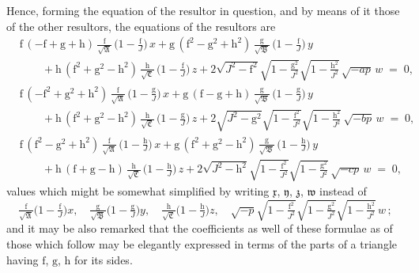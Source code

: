 \documentclass[11pt]{article}
\providecommand{\fA}{\mathfrak{A}}
\providecommand{\fB}{\mathfrak{B}}
\providecommand{\fC}{\mathfrak{C}}
\begin{document}
Hence, forming the equation of the resultor in question, and by means of it those of the other resultors, the equations of the resultors are
\begin{align*}
&\mathrm{f}\,(-\mathrm{f} + \mathrm{g} + \mathrm{h})\,\tfrac{\mathrm{f}}{\sqrt{\fA}}\,\bigl(1 - \tfrac{\mathrm{f}}{J}\bigr)\,x + \mathrm{g}\,(\mathrm{f}^{2} - \mathrm{g}^{2} + \mathrm{h}^{2})\,\tfrac{\mathrm{g}}{\sqrt{\fB}}\,\bigl(1 - \tfrac{\mathrm{f}}{J}\bigr)\,y\\
&\qquad + \mathrm{h}\,(\mathrm{f}^{2} + \mathrm{g}^{2} - \mathrm{h}^{2})\,\tfrac{\mathrm{h}}{\sqrt{\fC}}\,\bigl(1 - \tfrac{\mathrm{f}}{J}\bigr)\,z + 2\sqrt{J^{2} - \mathrm{f}^{2}}\sqrt{1 - \tfrac{\mathrm{g}^{2}}{J^{2}}}\sqrt{1 - \tfrac{\mathrm{h}^{2}}{J^{2}}}\,\sqrt{-ap}\,w \;=\; 0,\\[0.5em]
&\mathrm{f}\,(-\mathrm{f}^{2} + \mathrm{g}^{2} + \mathrm{h}^{2})\,\tfrac{\mathrm{f}}{\sqrt{\fA}}\,\bigl(1 - \tfrac{\mathrm{g}}{J}\bigr)\,x + \mathrm{g}\,( \mathrm{f} - \mathrm{g} + \mathrm{h})\,\tfrac{\mathrm{g}}{\sqrt{\fB}}\,\bigl(1 - \tfrac{\mathrm{g}}{J}\bigr)\,y\\
&\qquad + \mathrm{h}\,( \mathrm{f}^{2} + \mathrm{g}^{2} - \mathrm{h}^{2})\,\tfrac{\mathrm{h}}{\sqrt{\fC}}\,\bigl(1 - \tfrac{\mathrm{g}}{J}\bigr)\,z + 2\sqrt{J^{2} - \mathrm{g}^{2}}\sqrt{1 - \tfrac{\mathrm{f}^{2}}{J^{2}}}\sqrt{1 - \tfrac{\mathrm{h}^{2}}{J^{2}}}\,\sqrt{-bp}\,w \;=\; 0,\\[0.5em]
&\mathrm{f}\,( \mathrm{f}^{2} - \mathrm{g}^{2} + \mathrm{h}^{2})\,\tfrac{\mathrm{f}}{\sqrt{\fA}}\,\bigl(1 - \tfrac{\mathrm{h}}{J}\bigr)\,x + \mathrm{g}\,( \mathrm{f}^{2} + \mathrm{g}^{2} - \mathrm{h}^{2})\,\tfrac{\mathrm{g}}{\sqrt{\fB}}\,\bigl(1 - \tfrac{\mathrm{h}}{J}\bigr)\,y\\
&\qquad + \mathrm{h}\,( \mathrm{f} + \mathrm{g} - \mathrm{h})\,\tfrac{\mathrm{h}}{\sqrt{\fC}}\,\bigl(1 - \tfrac{\mathrm{h}}{J}\bigr)\,z + 2\sqrt{J^{2} - \mathrm{h}^{2}}\sqrt{1 - \tfrac{\mathrm{f}^{2}}{J^{2}}}\sqrt{1 - \tfrac{\mathrm{g}^{2}}{J^{2}}}\,\sqrt{-cp}\,w \;=\; 0,
\end{align*}
values which might be somewhat simplified by writing $\mathfrak{x}$, $\mathfrak{y}$, $\mathfrak{z}$, $\mathfrak{w}$ instead of
\[
\tfrac{\mathrm{f}}{\sqrt{\fA}}\bigl(1 - \tfrac{\mathrm{f}}{J}\bigr)x,\quad \tfrac{\mathrm{g}}{\sqrt{\fB}}\bigl(1 - \tfrac{\mathrm{g}}{J}\bigr)y,\quad \tfrac{\mathrm{h}}{\sqrt{\fC}}\bigl(1 - \tfrac{\mathrm{h}}{J}\bigr)z,\quad \sqrt{-p}\sqrt{1 - \tfrac{\mathrm{f}^{2}}{J^{2}}}\sqrt{1 - \tfrac{\mathrm{g}^{2}}{J^{2}}}\sqrt{1 - \tfrac{\mathrm{h}^{2}}{J^{2}}}\,w\,;
\]
and it may be also remarked that the coefficients as well of these formulae as of those which follow may be elegantly expressed in terms of the parts of a triangle having $\mathrm{f}$, $\mathrm{g}$, $\mathrm{h}$ for its sides.
\end{document}
